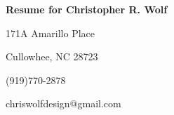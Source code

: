 \documentclass[12pt]{letter}
\begin{document}
    \thispagestyle{empty} %

    \centerline{\textbf{Resume for Christopher R. Wolf}}
    \centerline{171A Amarillo Place}
    \centerline{Cullowhee, NC 28723}
    \centerline{(919)770-2878}
    \centerline{chriswolfdesign@gmail.com}
\end{document}
